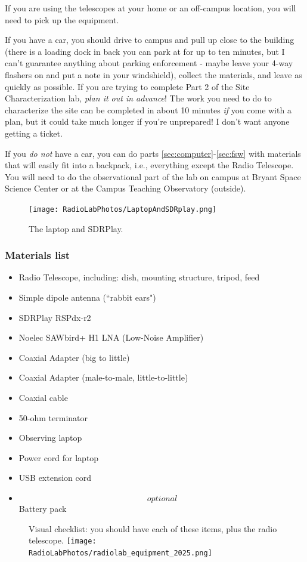 \documentclass[11pt]{article}
\begin{document}
If you are using the telescopes at your home or an off-campus location, you will need to pick up
the equipment.

If you have a car, you should drive to campus and pull up close to the building
(there is a loading dock in back you can park at for up to ten minutes, but I can't guarantee
anything about parking enforcement - maybe leave your 4-way flashers on and put a note in your windshield),
collect the materials, and leave as quickly as possible.
If you are trying to complete Part 2 of the Site Characterization lab, \emph{plan it out in advance}!
The work you need to do to characterize the site can be completed in about 10 minutes \emph{if}
you come with a plan, but it could take much longer if you're unprepared!  I don't want anyone getting a ticket.

If you \emph{do not} have a car, you can do parts \ref{sec:computer}-\ref{sec:fsw}
with materials that will easily fit into a backpack, i.e., everything except the Radio Telescope.
You will need to do the observational part of the lab on campus at Bryant Space Science Center or at
the Campus Teaching Observatory (outside).


\begin{figure}[h]
    \centering
    \texttt{[image: RadioLabPhotos/LaptopAndSDRplay.png]}
    \caption{The laptop and SDRPlay.}
\end{figure}

\clearpage
\subsubsection{Materials list}
\begin{itemize}
    \item Radio Telescope, including: dish, mounting structure, tripod, feed
    \item Simple dipole antenna (``rabbit ears")
    \item SDRPlay RSPdx-r2
    \item Noelec SAWbird+ H1 LNA (Low-Noise Amplifier)
    \item Coaxial Adapter (big to little)
    \item Coaxial Adapter (male-to-male, little-to-little)
    \item Coaxial cable
    \item 50-ohm terminator
    \item Observing laptop
    \item Power cord for laptop
    \item USB extension cord
    \item \[optional\] Battery pack
\end{itemize}
\begin{figure}[h]
    \centering
    Visual checklist: you should have each of these items, plus the radio telescope.
    \texttt{[image: RadioLabPhotos/radiolab\_equipment\_2025.png]}
\end{figure}
\end{document}
